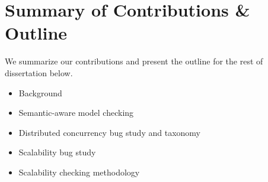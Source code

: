 \section{Summary of Contributions \& Outline}

We summarize our contributions and present the outline for the rest of
dissertation below.

\begin{itemize}

\item Background

\item Semantic-aware model checking

\item Distributed concurrency bug study and taxonomy

\item Scalability bug study

\item Scalability checking methodology

\end{itemize}
